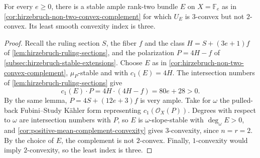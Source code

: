 \begin{corollary}\label{cor:hirzebruch-exact-complement-index}
For every $e\geq0$, there is a stable ample rank-two bundle $E$ on $X=\mathbb F_e$ as in \cref{cor:hirzebruch-non-two-convex-complement} for which $U_E$ is $3$-convex but not $2$-convex. Its least smooth convexity index is three.
\end{corollary}
\begin{proof}
Recall the ruling section $S$, the fiber $f$ and the class $H=S+(3e+1)f$ of \cref{lem:hirzebruch-ruling-sections}, and the polarization $P=4H-f$ of \cref{subsec:hirzebruch-stable-extensions}. Choose $E$ as in \cref{cor:hirzebruch-non-two-convex-complement}, $\mu_P$-stable and with $c_1(E)=4H$. The intersection numbers of \cref{lem:hirzebruch-ruling-sections} give
\[
 c_1(E)\cdot P=4H\cdot(4H-f)=80e+28>0.
\]
By the same lemma, $P=4S+(12e+3)f$ is very ample. Take for $\omega$ the pulled-back Fubini--Study K\"ahler form representing $c_1(\mathcal O_X(P))$. Degrees with respect to $\omega$ are intersection numbers with $P$, so $E$ is $\omega$-slope-stable with $\deg_\omega E>0$, and \cref{cor:positive-mean-complement-convexity} gives $3$-convexity, since $n=r=2$. By the choice of $E$, the complement is not $2$-convex. Finally, $1$-convexity would imply $2$-convexity, so the least index is three.
\end{proof}
